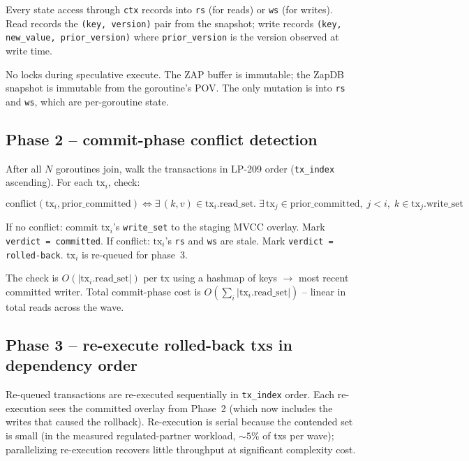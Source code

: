 Every state access through \texttt{ctx} records into \texttt{rs}
(for reads) or \texttt{ws} (for writes). Read records the
\texttt{(key, version)} pair from the snapshot; write records
\texttt{(key, new\_value, prior\_version)} where
\texttt{prior\_version} is the version observed at write time.

No locks during speculative execute. The ZAP buffer is immutable;
the ZapDB snapshot is immutable from the goroutine's POV. The only
mutation is into \texttt{rs} and \texttt{ws}, which are per-goroutine
state.

\subsection{Phase 2 -- commit-phase conflict detection}

After all $N$ goroutines join, walk the transactions in LP-209 order
(\texttt{tx\_index} ascending). For each $\textrm{tx}_i$, check:

\begin{equation}
\textrm{conflict}(\textrm{tx}_i, \textrm{prior\_committed}) \iff
\exists\,(k, v) \in \textrm{tx}_i.\textrm{read\_set}.\;
\exists\,\textrm{tx}_j \in \textrm{prior\_committed},\;
j < i,\; k \in \textrm{tx}_j.\textrm{write\_set}
\end{equation}

If no conflict: commit $\textrm{tx}_i$'s \texttt{write\_set} to the
staging MVCC overlay. Mark \texttt{verdict = committed}. If
conflict: $\textrm{tx}_i$'s \texttt{rs} and \texttt{ws} are stale.
Mark \texttt{verdict = rolled-back}. $\textrm{tx}_i$ is re-queued
for phase~3.

The check is $O(|\textrm{tx}_i.\textrm{read\_set}|)$ per tx using a
hashmap of keys $\to$ most recent committed writer. Total
commit-phase cost is
$O(\sum_i |\textrm{tx}_i.\textrm{read\_set}|)$ -- linear in total
reads across the wave.

\subsection{Phase 3 -- re-execute rolled-back txs in dependency order}

Re-queued transactions are re-executed sequentially in
\texttt{tx\_index} order. Each re-execution sees the committed
overlay from Phase~2 (which now includes the writes that caused the
rollback). Re-execution is serial because the contended set is small
(in the measured regulated-partner workload, $\sim 5\%$ of txs per wave);
parallelizing re-execution recovers little throughput at significant
complexity cost.

